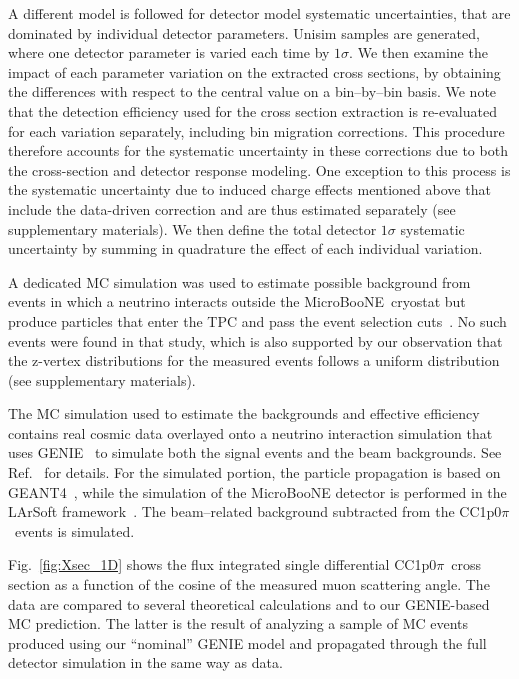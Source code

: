 \documentclass[aps,prl,showpacs,twocolumn,superscriptaddress,letterpaper,longbibliography]{revtex4-1}
\newcommand{\uB}{MicroBooNE}
\newcommand{\CCIpOpi}{CC1p0$\pi$}
\begin{document}
 
A different model is followed for detector model systematic uncertainties, 
that are dominated by individual detector parameters.
Unisim samples \cite{Roe:2007hw} are generated, where one detector parameter is varied each time by $1\sigma$.  We then examine the impact of each parameter variation on the extracted 
cross sections, by obtaining the differences with respect to the central value on a bin--by--bin basis.
We note that the detection efficiency used for the cross section extraction is re-evaluated for each variation separately, including bin migration corrections. This procedure therefore accounts for the systematic uncertainty in these corrections due to both the cross-section and detector response modeling.
One exception to this process is the systematic uncertainty due to induced charge effects mentioned above that include the data-driven correction and are thus estimated separately (see supplementary materials).
We then define the total detector $1\sigma$ systematic uncertainty by summing in quadrature the effect of each individual variation. 

A dedicated MC simulation was used to estimate possible background from events in which a neutrino interacts outside the \uB\ cryostat but produce particles that enter the TPC and pass the event selection cuts~\cite{Abratenko:2019jqo}. No such events were found in that study, which is also supported by our observation that the z-vertex distributions for the measured events follows a uniform distribution (see supplementary materials).

The MC simulation used to estimate the backgrounds and effective efficiency contains real cosmic data overlayed onto a neutrino interaction simulation that uses 
GENIE~\cite{Andreopoulos:2009rq,Andreopoulos:2015wxa} to simulate both the signal events and the beam backgrounds.
See Ref.~\cite{Adams:2018lzd} for details. For the simulated portion, the particle propagation is based on GEANT4~\cite{Geant4}, while the simulation of the MicroBooNE detector 
is performed in the LArSoft framework~\cite{Pordes:2016ycs,Snider:2017wjd}. 
The beam--related background subtracted from the \CCIpOpi\ events is simulated.




Fig.~\ref{fig:Xsec_1D} shows the flux integrated single differential \CCIpOpi\ cross section 
as a function of the cosine of the measured muon scattering angle.
The data are compared to several theoretical 
calculations and to our GENIE-based MC prediction.
The latter is the result of analyzing a sample of MC events produced using 
our ``nominal'' GENIE model and propagated through the full detector simulation in the same way as data. 
\end{document}
